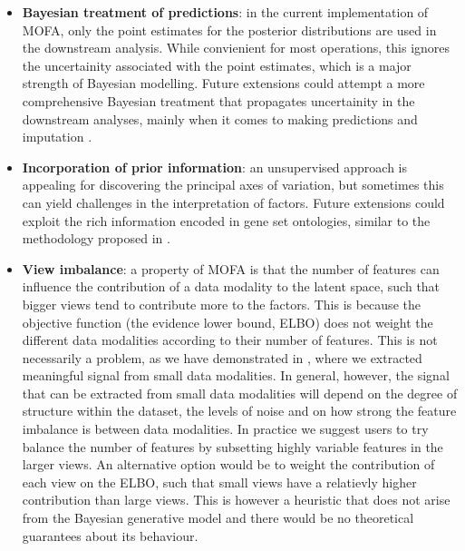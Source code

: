 \begin{itemize}

	\item \textbf{Bayesian treatment of predictions}: in the current implementation of MOFA, only the point estimates for the posterior distributions are used in the downstream analysis. While convienient for most operations, this ignores the uncertainity associated with the point estimates, which is a major strength of Bayesian modelling. Future extensions could attempt a more comprehensive Bayesian treatment that propagates uncertainity in the downstream analyses, mainly when it comes to making predictions and imputation \cite{Gelman2013}.

	\item \textbf{Incorporation of prior information}: an unsupervised approach is appealing for discovering the principal axes of variation, but sometimes this can yield challenges in the interpretation of factors. Future extensions could exploit the rich information encoded in gene set ontologies, similar to the methodology proposed in \cite{Buettner2017}.

	\item \textbf{View imbalance}: a property of MOFA is that the number of features can influence the contribution of a data modality to the latent space, such that bigger views tend to contribute more to the factors. This is because the objective function (the evidence lower bound, ELBO) does not weight the different data modalities according to their number of features. This is not necessarily a problem, as we have demonstrated in , where we extracted meaningful signal from small data modalities. In general, however, the signal that can be extracted from small data modalities will depend on the degree of structure within the dataset, the levels of noise and on how strong the feature imbalance is between data modalities. In practice we suggest users to try balance the number of features by subsetting highly variable features in the larger views. An alternative option would be to weight the contribution of each view on the ELBO, such that small views have a relatievly higher contribution than large views. This is however a heuristic that does not arise from the Bayesian generative model and there would be no theoretical guarantees about its behaviour.

\end{itemize}

